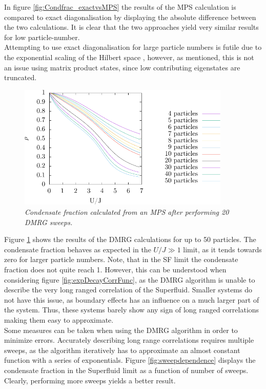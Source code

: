 In figure \ref{fig:Condfrac_exactvsMPS} the results of the MPS calculation is compared to exact diagonalisation by displaying the absolute difference between the two calculations. It is clear that the two approaches yield very similar results for low particle-number.\\
Attempting to use exact diagonalisation for large particle numbers is futile due to the exponential scaling of the Hilbert space \cite{Vidal2003}, however, as mentioned, this is not an issue using matrix product states, since low contributing eigenstates are truncated. 
\begin{figure}[h!]
	\centering
	\includegraphics[width=0.9\textwidth]{Figures/Condfrac_4to50.pdf}
	\caption{\textit{Condensate fraction calculated from an MPS after performing 20 DMRG sweeps.}}
	\label{fig:Condfrac_4to50}
\end{figure}
Figure \ref{fig:Condfrac_4to50} shows the results of the DMRG calculations for up to 50 particles. The condensate fraction behaves as expected in the $U/J \gg 1$ limit, as it tends towards zero for larger particle numbers. Note, that in the SF limit the condensate fraction does not quite reach 1. However, this can be understood when considering figure \ref{fig:expDecayCorrFunc}, as the DMRG algorithm is unable to describe the very long ranged correlation of the Superfluid.
Smaller systems do not have this issue, as boundary effects has an influence on a much larger part of the system. Thus, these systems barely show any sign of long ranged correlations making them easy to approximate.\\
Some measures can be taken when using the DMRG algorithm in order to minimize errors. Accurately describing long range correlations requires multiple sweeps, as the algorithm iteratively has to approximate an almost constant function with a series of exponentials. Figure \ref{fig:sweepdependence} displays the condensate fraction in the Superfluid limit as a function of number of sweeps. Clearly, performing more sweeps yields a better result.
